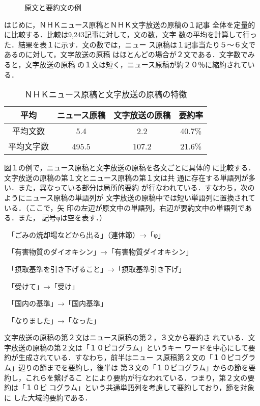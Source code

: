 \begin{figure}
  \vspace*{-1cm}
\begin{center}
\vspace*{-4mm}
\vspace{-3mm}
  \caption{原文と要約文の例}
\end{center}
\end{figure}

はじめに，ＮＨＫニュース原稿とＮＨＫ文字放送の原稿の１記事
全体を定量的に比較する．比較は9,243記事に対して，文の数，文字
数の平均を計算して行った．結果を表１に示す．文の数では，ニュー
ス原稿は１記事当たり５〜６文であるのに対して，文字放送の原稿
はほとんどの場合が２文である．文字数でみると，文字放送の原稿
の１文は短く，ニュース原稿が約２０％に縮約されている．

\begin{table}
 \begin{center}
  \caption{ＮＨＫニュース原稿と文字放送の原稿の特徴}
  \begin{tabular}{c|c|c|c} \hline \hline
   平均 & ニュース原稿 & 文字放送の原稿 & 要約率 \\ \hline
   平均文数 & 5.4 & 2.2 & 40.7\% \\
   平均文字数 & 495.5 & 107.2 & 21.6\% \\ \hline
  \end{tabular}
 \end{center}
\end{table}

図１の例で，ニュース原稿と文字放送の原稿を各文ごとに具体的
に比較する．文字放送の原稿の第１文とニュース原稿の第１文は共
通に存在する単語列が多い．また，異なっている部分は局所的要約
が行なわれている．すなわち，次のようにニュース原稿の単語列が
文字放送の原稿中では短い単語列に置換されている．（ここで，矢
印の左辺が原文中の単語列，右辺が要約文中の単語列である．また，
記号φは空を表す．）

　「ごみの焼却場などから出る」（連体節）→「φ」

　「有害物質のダイオキシン」→「有害物質ダイオキシン」

　「摂取基準を引き下げること」→「摂取基準引き下げ」

　「受けて」→「受け」

　「国内の基準」→「国内基準」

　「なりました」→「なった」

\vspace{-3mm}
文字放送の原稿の第２文はニュース原稿の第２，３文から要約さ
れている．文字放送の原稿の第２文は「１０ピコグラム」というキー
ワードを中心にして要約が生成されている．すなわち，前半はニュー
ス原稿第２文の「１０ピコグラム」辺りの節までを要約し，後半は
第３文の「１０ピコグラム」からの節を要約し，これらを繋げるこ
とにより要約が行なわれている．つまり，第２文の要約は「１０ピ
コグラム」という共通単語列を考慮して要約しており，節を対象に
した大域的要約である．

